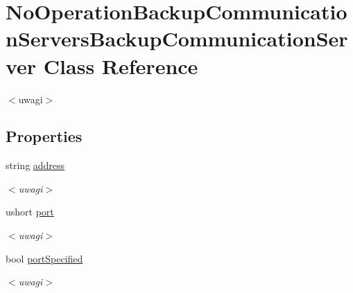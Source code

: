 \hypertarget{class_no_operation_backup_communication_servers_backup_communication_server}{}\section{No\+Operation\+Backup\+Communication\+Servers\+Backup\+Communication\+Server Class Reference}
\label{class_no_operation_backup_communication_servers_backup_communication_server}


$<$uwagi$>$  


\subsection*{Properties}
\begin{DoxyCompactItemize}
\item 
\hypertarget{class_no_operation_backup_communication_servers_backup_communication_server_ae629091935c0deff83ce3b1c7e6c23d3}{}string \hyperlink{class_no_operation_backup_communication_servers_backup_communication_server_ae629091935c0deff83ce3b1c7e6c23d3}{address}\label{class_no_operation_backup_communication_servers_backup_communication_server_ae629091935c0deff83ce3b1c7e6c23d3}

\begin{DoxyCompactList}\small\item\em $<$uwagi$>$ \end{DoxyCompactList}\item 
\hypertarget{class_no_operation_backup_communication_servers_backup_communication_server_a941b34aabf70f244e5e24ab8057b3e60}{}ushort \hyperlink{class_no_operation_backup_communication_servers_backup_communication_server_a941b34aabf70f244e5e24ab8057b3e60}{port}\label{class_no_operation_backup_communication_servers_backup_communication_server_a941b34aabf70f244e5e24ab8057b3e60}

\begin{DoxyCompactList}\small\item\em $<$uwagi$>$ \end{DoxyCompactList}\item 
\hypertarget{class_no_operation_backup_communication_servers_backup_communication_server_ac86c2d1d814e601ce170bdddb9ecb63d}{}bool \hyperlink{class_no_operation_backup_communication_servers_backup_communication_server_ac86c2d1d814e601ce170bdddb9ecb63d}{port\+Specified}\label{class_no_operation_backup_communication_servers_backup_communication_server_ac86c2d1d814e601ce170bdddb9ecb63d}

\begin{DoxyCompactList}\small\item\em $<$uwagi$>$ \end{DoxyCompactList}\end{DoxyCompactItemize}


